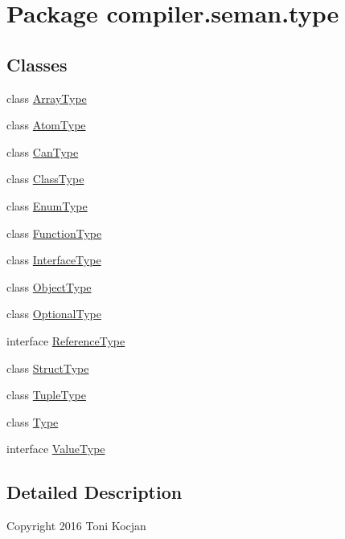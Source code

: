 \hypertarget{namespacecompiler_1_1seman_1_1type}{}\section{Package compiler.\+seman.\+type}
\label{namespacecompiler_1_1seman_1_1type}
\subsection*{Classes}
\begin{DoxyCompactItemize}
\item 
class \hyperlink{classcompiler_1_1seman_1_1type_1_1_array_type}{Array\+Type}
\item 
class \hyperlink{classcompiler_1_1seman_1_1type_1_1_atom_type}{Atom\+Type}
\item 
class \hyperlink{classcompiler_1_1seman_1_1type_1_1_can_type}{Can\+Type}
\item 
class \hyperlink{classcompiler_1_1seman_1_1type_1_1_class_type}{Class\+Type}
\item 
class \hyperlink{classcompiler_1_1seman_1_1type_1_1_enum_type}{Enum\+Type}
\item 
class \hyperlink{classcompiler_1_1seman_1_1type_1_1_function_type}{Function\+Type}
\item 
class \hyperlink{classcompiler_1_1seman_1_1type_1_1_interface_type}{Interface\+Type}
\item 
class \hyperlink{classcompiler_1_1seman_1_1type_1_1_object_type}{Object\+Type}
\item 
class \hyperlink{classcompiler_1_1seman_1_1type_1_1_optional_type}{Optional\+Type}
\item 
interface \hyperlink{interfacecompiler_1_1seman_1_1type_1_1_reference_type}{Reference\+Type}
\item 
class \hyperlink{classcompiler_1_1seman_1_1type_1_1_struct_type}{Struct\+Type}
\item 
class \hyperlink{classcompiler_1_1seman_1_1type_1_1_tuple_type}{Tuple\+Type}
\item 
class \hyperlink{classcompiler_1_1seman_1_1type_1_1_type}{Type}
\item 
interface \hyperlink{interfacecompiler_1_1seman_1_1type_1_1_value_type}{Value\+Type}
\end{DoxyCompactItemize}


\subsection{Detailed Description}
Copyright 2016 Toni Kocjan

